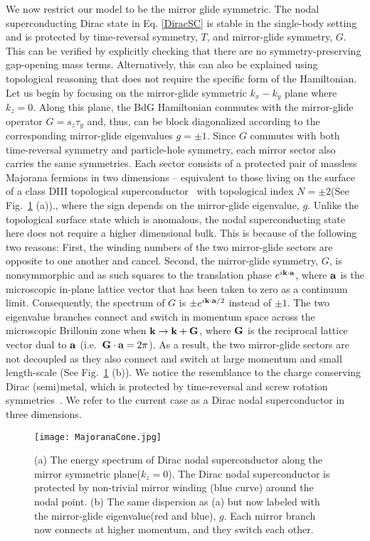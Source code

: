 We now restrict our model to be the mirror glide symmetric. The nodal superconducting Dirac state in Eq. \eqref{DiracSC} is stable in the single-body setting and is protected by time-reversal symmetry, $T$, and mirror-glide symmetry, $G$. This can be verified by explicitly checking that there are no symmetry-preserving gap-opening mass terms. Alternatively, this can also be explained using topological reasoning that does not require the specific form of the Hamiltonian. Let us begin by focusing on the mirror-glide symmetric $k_x-k_y$ plane where $k_z=0$. Along this plane, the BdG Hamiltonian commutes with the mirror-glide operator $G=s_z\tau_y$ and, thus, can be block diagonalized according to the corresponding mirror-glide eigenvalues $g=\pm1$. Since $G$ commutes with both time-reversal symmetry and particle-hole symmetry, each mirror sector also carries the same symmetries.  Each sector consists of a protected pair of massless Majorana fermions in two dimensions -- equivalent to those living on the surface of a class DIII topological superconductor~\cite{Ryu2008,Kitaevtable08} with topological index $N=\pm2$(See Fig.~\ref{fig:MajoranaCone} (a))., where the sign depends on the mirror-glide eigenvalue, $g$. Unlike the topological surface state which is anomalous, the nodal superconducting state here does not require a higher dimensional bulk. This is because of the following two reasons: First, the winding numbers of the two mirror-glide sectors are opposite to one another and cancel. Second, the mirror-glide symmetry, $G$, is nonsymmorphic and as such squares to the translation phase $e^{i{\bf k}\cdot{\bf a}}$, where ${\bf a}$ is the microscopic in-plane lattice vector that has been taken to zero as a continuum limit. Consequently, the spectrum of $G$ is $\pm e^{i{\bf k}\cdot{\bf a}/2}$ instead of $\pm1$. The two eigenvalue branches connect and switch in momentum space across the microscopic Brillouin zone when ${\bf k}\to{\bf k}+{\bf G}$, where ${\bf G}$ is the reciprocal lattice vector dual to ${\bf a}$ (i.e.~${\bf G}\cdot{\bf a}=2\pi$). As a result, the two mirror-glide sectors are not decoupled as they also connect and switch at large momentum and small length-scale (See Fig.~\ref{fig:MajoranaCone} (b)). We notice the resemblance to the charge conserving Dirac (semi)metal, which is protected by time-reversal and screw rotation symmetries~\cite{RazaSirotaTeo17}.  We refer to the current case as a Dirac nodal superconductor in three dimensions.



\begin{figure}[htbp]
	\centering\texttt{[image: MajoranaCone.jpg]}
	\caption[The energy spectrum of Dirac nodal superconductor.]{(a) The energy spectrum of Dirac nodal superconductor along the mirror symmetric plane($k_z=0$). The Dirac nodal superconductor is protected by non-trivial mirror winding (blue curve) around the nodal point. (b) The same dispersion as (a) but now labeled with the mirror-glide eigenvalue(red and blue), $g$. Each mirror branch now connects at higher momentum, and they switch each other.}\label{fig:MajoranaCone}
\end{figure}

